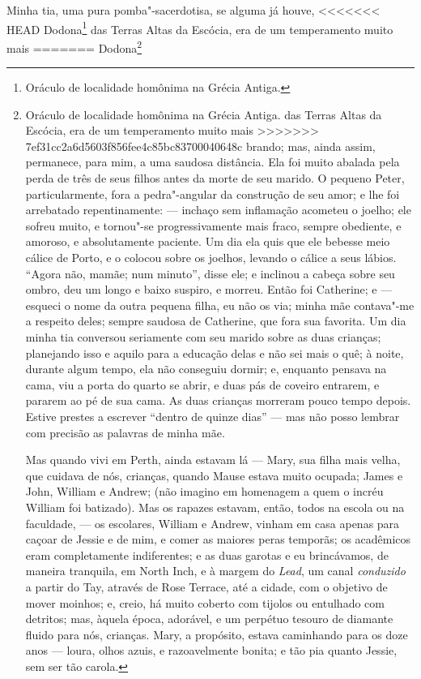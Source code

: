 {{{{{{{{{{{{{{{{{{{%
Minha tia, uma pura pomba"-sacerdotisa, se alguma já houve,
<<<<<<< HEAD
Dodona\footnote{Oráculo de localidade homônima na Grécia Antiga.} das Terras Altas da Escócia, era de um temperamento muito mais
=======
Dodona\footnote{Oráculo de localidade homônima na Grécia Antiga.  das Terras Altas da Escócia, era de um temperamento muito mais
>>>>>>> 7ef31cc2a6d5603f856fee4c85bc83700040648c
brando; mas, ainda assim, permanece, para mim, a uma saudosa distância.
Ela foi muito abalada pela perda de três de seus filhos antes da morte
de seu marido. O pequeno Peter, particularmente, fora a pedra"-angular da
construção de seu amor; e lhe foi arrebatado repentinamente: --- inchaço
sem inflamação acometeu o joelho; ele sofreu muito, e tornou"-se
progressivamente mais fraco, sempre obediente, e amoroso, e
absolutamente paciente. Um dia ela quis que ele bebesse meio cálice de
Porto, e o colocou sobre os joelhos, levando o cálice a seus lábios.
``Agora não, mamãe; num minuto'', disse ele; e inclinou a cabeça sobre
seu ombro, deu um longo e baixo suspiro, e morreu. Então foi Catherine;
e --- esqueci o nome da outra pequena filha, eu não os via; minha mãe
contava"-me a respeito deles; sempre saudosa de Catherine, que fora sua
favorita. Um dia minha tia conversou seriamente com seu marido sobre as
duas crianças; planejando isso e aquilo para a educação delas e não sei
mais o quê; à noite, durante algum tempo, ela não conseguiu dormir; e,
enquanto pensava na cama, viu a porta do quarto se abrir, e duas pás de
coveiro entrarem, e pararem ao pé de sua cama. As duas crianças morreram
pouco tempo depois. Estive prestes a escrever ``dentro de quinze dias''
--- mas não posso lembrar com precisão as palavras de minha mãe.

Mas quando vivi em Perth, ainda estavam lá --- Mary, sua filha mais
velha, que cuidava de nós, crianças, quando Mause estava muito ocupada;
James e John, William e Andrew; (não imagino em homenagem a quem o
incréu William foi batizado). Mas os rapazes estavam, então, todos na
escola ou na faculdade, --- os escolares, William e Andrew, vinham em
casa apenas para caçoar de Jessie e de mim, e comer as maiores peras
temporãs; os acadêmicos eram completamente indiferentes; e as duas
garotas e eu brincávamos, de maneira tranquila, em North Inch, e à
margem do \textit{Lead}, um canal \textit{conduzido} a partir do Tay, através de
Rose Terrace, até a cidade, com o objetivo de mover moinhos; e, creio,
há muito coberto com tijolos ou entulhado com detritos; mas, àquela
época, adorável, e um perpétuo tesouro de diamante fluido para nós,
crianças. Mary, a propósito, estava caminhando para os doze anos ---
loura, olhos azuis, e razoavelmente bonita; e tão pia quanto Jessie, sem
ser tão carola.

}}}}}}}}}}}}}}}}}}}}
